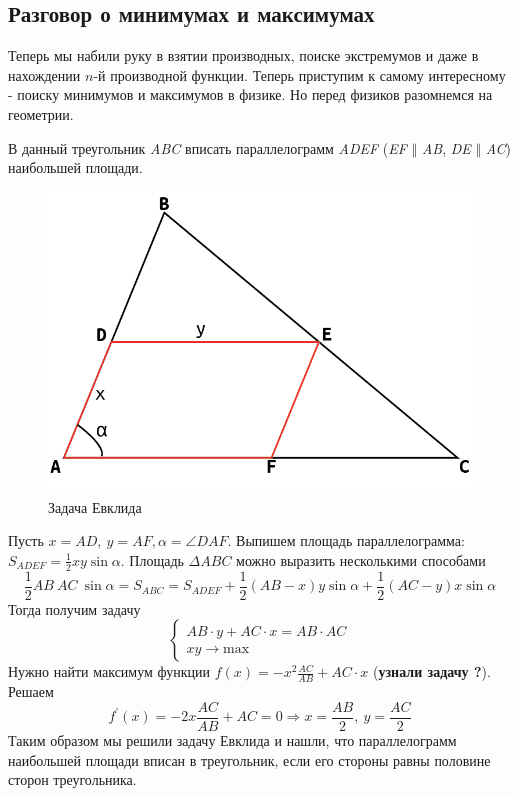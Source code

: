 \subsection{Разговор о минимумах и максимумах}
Теперь мы набили руку в взятии производных, поиске экстремумов и даже в нахождении $n$-й производной функции. Теперь приступим к самому интересному - поиску минимумов и максимумов в физике. Но перед физиков разомнемся на геометрии.
\begin{example}
    В данный треугольник \textit{ABC} вписать параллелограмм \textit{ADEF} (\textit{EF} $\Vert$ \textit{AB}, \textit{DE} $\Vert$ \textit{AC}) наибольшей площади.

    \begin{figure}[h!]
        \centering
        \includegraphics[scale=0.5]{pics/geom_evklid.png}
        \caption{Задача Евклида}
    \end{figure}

    Пусть $x = AD,\ y = AF, \alpha = \angle DAF$. Выпишем площадь параллелограмма: $S_{ADEF} = \frac{1}{2} xy \sin \alpha$. Площадь $\Delta ABC$ можно выразить несколькими способами
    \begin{equation*}
        \frac{1}{2} AB\ AC\ \sin \alpha = S_{ABC} = S_{ADEF} + \frac{1}{2} (AB - x) y \sin \alpha + \frac{1}{2} (AC - y) x \sin \alpha
    \end{equation*}
    Тогда получим задачу
    \begin{equation*}
        \begin{cases}
            AB \cdot y + AC \cdot x = AB \cdot AC\\
            xy \rightarrow \text{max}
        \end{cases}
    \end{equation*}
    Нужно найти максимум функции $f(x) = -x^2 \frac{AC}{AB} + AC \cdot x$ (\textbf{узнали задачу ?}). Решаем
    \begin{equation*}
        f^{'}(x) = -2x \frac{AC}{AB} + AC = 0 \Rightarrow x = \frac{AB}{2},\ y = \frac{AC}{2}
    \end{equation*}
    Таким образом мы решили задачу Евклида и нашли, что параллелограмм наибольшей площади вписан в треугольник, если его стороны равны половине сторон треугольника.
\end{example}
